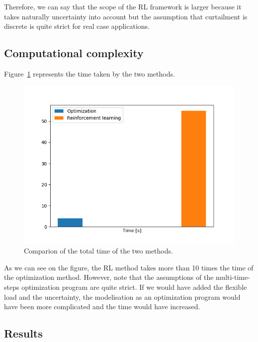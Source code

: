 Therefore, we can say that the scope of the RL framework is larger because it takes naturally uncertainty into account but the assumption that curtailment is discrete is quite strict for real case applications.

\subsection{Computational complexity}
Figure~\ref{fig:time} represents the time taken by the two methods.

\begin{figure}
\centering
\includegraphics[scale=0.5]{img/time}
\caption{Comparion of the total time of the two methods.}
\label{fig:time}
\end{figure}

As we can see on the figure, the RL method takes more than 10 times the time of the optimization method.
However, note that the assumptions of the multi-time-steps optimization program are quite strict.
If we would have added the flexible load and the uncertainty, the modelisation as an optimization program would have been more complicated and the time would have increased. 

\subsection{Results}
